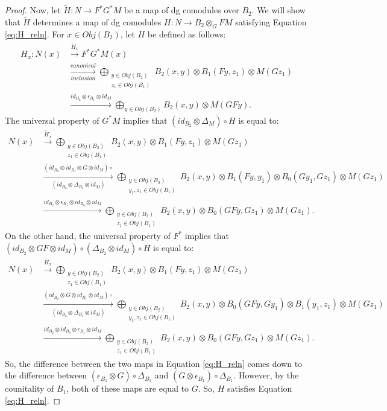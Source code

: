 \begin{proof}
Now, let $\tilde{H}: N \to F^*G^*M$ 
be a map of dg comodules over $B_2$. 
We will show 
that $\tilde{H}$ determines a map of dg 
comodules $H: N \to B_2 \otimes_GF M$ 
satisfying Equation \ref{eq:H_reln}. 
For $x \in Obj(B_2)$, let $H$ be 
defined as follows:
\begin{align*}
H_x: N(x)
&\xrightarrow{\tilde{H}_x}
F^*G^*M(x)\\
&\xrightarrow[inclusion]{canonical}
\bigoplus \limits_{\substack{
	y \in Obj(B_2)\\
	z_1 \in Obj(B_1)}}
  B_2(x,y) \otimes B_1(Fy, z_1) \otimes 
  M(Gz_1)\\
&\xrightarrow{id_{B_2} \otimes \epsilon_{B_1} 
   \otimes id_M}  
\bigoplus \limits_{y \in Obj(B_2)}
  B_2(x,y) \otimes M(GFy).
\end{align*}
The universal property of $G^*M$ implies 
that $(id_{B_2} \otimes \Delta_M) \circ H$ 
is equal to:
\begin{align*}
N(x)
&\xrightarrow{\tilde{H}_x} 
\bigoplus \limits_{\substack{
	y \in Obj(B_2)\\
	z_1 \in Obj(B_1)}}
  B_2(x,y) \otimes B_1(Fy, z_1) \otimes 
  M(Gz_1)\\
&\xrightarrow[(id_{B_2} \otimes \Delta_{B_1} 
  \otimes id_M)]{(id_{B_2} \otimes id_{B_1}
  \otimes G \otimes id_M)\circ}
\bigoplus \limits_{\substack{
	y \in Obj(B_2)\\
	y_1, z_1 \in Obj(B_1)}}
  B_2(x,y) \otimes B_1(Fy, y_1) \otimes 
  B_0(Gy_1, Gz_1) \otimes M(Gz_1) \\
&\xrightarrow{id_{B_2} \otimes \epsilon_{B_1}
  \otimes id_{B_0} \otimes id_M}
\bigoplus \limits_{\substack{
	y \in Obj(B_2)\\
	z_1 \in Obj(B_1)}}
  B_2(x,y) \otimes B_0(GFy, Gz_1) \otimes M(Gz_1).   
\end{align*}
On the other hand, the universal property 
of $F^*$ implies that $(id_{B_2} \otimes GF 
\otimes id_M) \circ (\Delta_{B_2}\otimes id_M) 
\circ H$ is equal to:
\begin{align*}
N(x)
&\xrightarrow{\tilde{H}_x} 
\bigoplus \limits_{\substack{
	y \in Obj(B_2)\\
	z_1 \in Obj(B_1)}}
  B_2(x,y) \otimes B_1(Fy, z_1) \otimes 
  M(Gz_1)\\
&\xrightarrow[(id_{B_2} \otimes \Delta_{B_1} 
  \otimes id_M)]{(id_{B_2} \otimes G
  \otimes id_{B_1} \otimes id_M)\circ}
\bigoplus \limits_{\substack{
	y \in Obj(B_2)\\
	y_1, z_1 \in Obj(B_1)}}
  B_2(x,y) \otimes B_0(GFy,Gy_1) \otimes
  B_1(y_1, z_1) \otimes M(Gz_1) \\
&\xrightarrow{id_{B_2} \otimes id_{B_0} 
  \otimes \epsilon_{B_1} \otimes id_M}
\bigoplus \limits_{\substack{
	y \in Obj(B_2)\\
	z_1 \in Obj(B_1)}}
  B_2(x,y) \otimes B_0(GFy, Gz_1) \otimes M(Gz_1).   
\end{align*}
So, the difference between the two maps 
in Equation \ref{eq:H_reln} comes down 
to the difference between 
$(\epsilon_{B_1} \otimes G) \circ \Delta_{B_1}$ 
and $(G \otimes \epsilon_{B_1}) \circ \Delta_{B_1}$. 
However, by the counitality of $B_1$, both of 
these maps are equal to $G$. So, $H$ satisfies 
Equation \ref{eq:H_reln}.
\end{proof}
